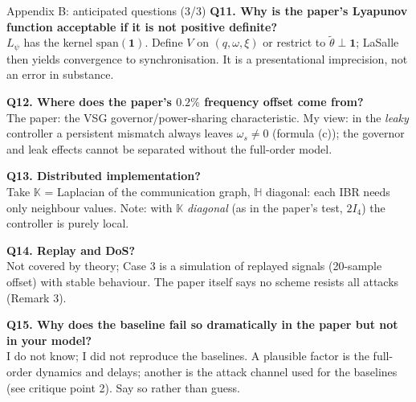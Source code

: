 \documentclass[aspectratio=169,9pt]{beamer}
\newcommand{\bbK}{\mathbb{K}}
\newcommand{\bbH}{\mathbb{H}}
\newcommand{\ones}{\mathbf{1}}
\begin{document}
\begin{frame}[t]{Appendix B: anticipated questions (3/3)}
\scriptsize
\textbf{Q11. Why is the paper's Lyapunov function acceptable if it is not positive definite?}\\
$L_\psi$ has the kernel $\mathrm{span}(\ones)$. Define $V$ on $(q,\omega,\xi)$ or restrict to $\tilde\theta\perp\ones$; LaSalle then yields convergence to synchronisation. It is a presentational imprecision, not an error in substance.
\medskip

\textbf{Q12. Where does the paper's $0.2\%$ frequency offset come from?}\\
The paper: the VSG governor/power-sharing characteristic. My view: in the \emph{leaky} controller a persistent mismatch always leaves $\omega_s\ne0$ (formula (c)); the governor and leak effects cannot be separated without the full-order model.
\medskip

\textbf{Q13. Distributed implementation?}\\
Take $\bbK$ = Laplacian of the communication graph, $\bbH$ diagonal: each IBR needs only neighbour values. Note: with $\bbK$ \emph{diagonal} (as in the paper's test, $2I_4$) the controller is purely local.
\medskip

\textbf{Q14. Replay and DoS?}\\
Not covered by theory; Case 3 is a simulation of replayed signals (20-sample offset) with stable behaviour. The paper itself says no scheme resists all attacks (Remark 3).
\medskip

\textbf{Q15. Why does the baseline fail so dramatically in the paper but not in your model?}\\
I do not know; I did not reproduce the baselines. A plausible factor is the full-order dynamics and delays; another is the attack channel used for the baselines (see critique point 2). Say so rather than guess.
\end{frame}
\end{document}
